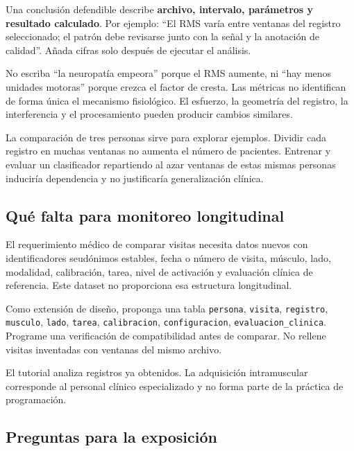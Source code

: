 \documentclass[
  spanish,
  10.5pt,
  a4paper,
  DIV=11,
  numbers=noendperiod]{scrartcl}
\begin{document}
Una conclusión defendible describe \textbf{archivo, intervalo,
parámetros y resultado calculado}. Por ejemplo: ``El RMS varía entre
ventanas del registro seleccionado; el patrón debe revisarse junto con
la señal y la anotación de calidad''. Añada cifras solo después de
ejecutar el análisis.

No escriba ``la neuropatía empeora'' porque el RMS aumente, ni ``hay
menos unidades motoras'' porque crezca el factor de cresta. Las métricas
no identifican de forma única el mecanismo fisiológico. El esfuerzo, la
geometría del registro, la interferencia y el procesamiento pueden
producir cambios similares.

La comparación de tres personas sirve para explorar ejemplos. Dividir
cada registro en muchas ventanas no aumenta el número de pacientes.
Entrenar y evaluar un clasificador repartiendo al azar ventanas de estas
mismas personas induciría dependencia y no justificaría generalización
clínica.

\subsection{Qué falta para monitoreo
longitudinal}\label{quuxe9-falta-para-monitoreo-longitudinal}

El requerimiento médico de comparar visitas necesita datos nuevos con
identificadores seudónimos estables, fecha o número de visita, músculo,
lado, modalidad, calibración, tarea, nivel de activación y evaluación
clínica de referencia. Este dataset no proporciona esa estructura
longitudinal.

Como extensión de diseño, proponga una tabla \texttt{persona},
\texttt{visita}, \texttt{registro}, \texttt{musculo}, \texttt{lado},
\texttt{tarea}, \texttt{calibracion}, \texttt{configuracion},
\texttt{evaluacion\_clinica}. Programe una verificación de
compatibilidad antes de comparar. No rellene visitas inventadas con
ventanas del mismo archivo.

El tutorial analiza registros ya obtenidos. La adquisición intramuscular
corresponde al personal clínico especializado y no forma parte de la
práctica de programación.

\subsection{Preguntas para la
exposición}\label{preguntas-para-la-exposiciuxf3n}
\end{document}
